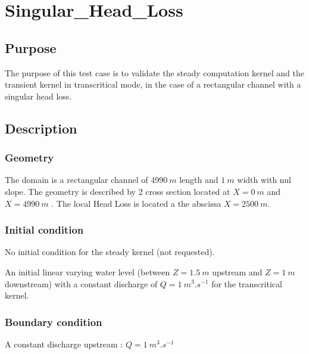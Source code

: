 \chapter{Singular\_Head\_Loss}
%


\section{Purpose}
The purpose of this test case is to validate the steady computation kernel and the transient kernel in transcritical mode, in the case of a rectangular channel with a singular head loss.
 
\section{Description}

\subsection{Geometry}

The domain is a rectangular channel of $ 4990\ m $ length and $ 1\ m $ width with nul slope.
The geometry is described by 2 cross section located at $ X = 0\ m $ and $ X = 4990\ m $ .
The local Head Loss is located a the abscissa $ X = 2500 \ m $.

\subsection{Initial condition}

No initial condition for the steady kernel (not requested).

An initial linear varying water level (between $ Z = 1.5\ m $ upstream and $ Z = 1\ m $ downstream) with a constant discharge of $ Q = 1\ m^{3}.s^{-1} $ for the transcritical kernel.

\subsection{Boundary condition}

A constant discharge upstream : $ Q = 1\ m^{3}.s^{-1} $

